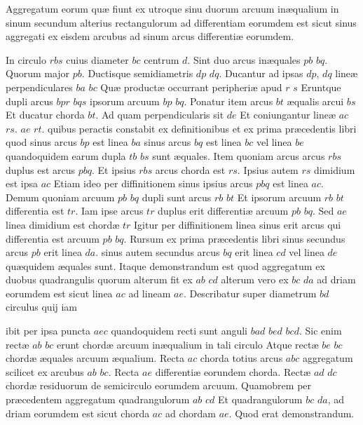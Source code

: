\documentclass[11pt,a4paper]{article}
\begin{document}
Aggregatum eorum quæ fiunt ex utroque sinu duorum arcuum inæqualium in sinum secundum alterius rectangulorum ad differentiam eorumdem est sicut sinus aggregati ex eisdem arcubus ad sinum arcus differentiæ eorumdem.

In circulo $rbs$ cuius diameter $bc$ centrum $d$. Sint duo arcus inæquales $pb$ $bq$. Quorum major $pb$. Ductisque semidiametris $dp$ $dq$. Ducantur ad ipsas $dp$, $dq$ lineæ perpendiculares $ba$ $bc$ Quæ productæ occurrant peripheriæ apud $r$ $s$ Eruntque dupli arcus $bpr$ $bqs$ ipsorum arcuum $bp$ $bq$. Ponatur item arcus $bt$ æqualis arcui $bs$ Et ducatur chorda $bt$. Ad quam perpendicularis sit $de$ Et coniungantur lineæ $ac$ $rs$. $ae$ $rt$. quibus peractis constabit ex definitionibus et ex prima præcedentis libri quod sinus arcus $bp$ est linea $ba$ sinus arcus $bq$ est linea $bc$ vel linea $be$ quandoquidem earum dupla $tb$ $bs$ sunt æquales. Item quoniam arcus arcus $rbs$ duplus est arcus $pbq$. Et ipsius $rbs$ arcus chorda est $rs$. Ipsius autem $rs$ dimidium est ipsa $ac$ Etiam ideo per diffinitionem sinus ipsius arcus $pbq$ est linea $ac$. Demum quoniam arcuum $pb$ $bq$ dupli sunt arcus $rb$ $bt$ Et ipsorum arcuum $rb$ $bt$ differentia est $tr$. Iam ipse arcus $tr$ duplus erit differentiæ arcuum $pb$ $bq$. Sed $ae$ linea dimidium est chordæ $tr$ Igitur per diffinitionem linea  sinus erit arcus qui differentia est arcuum $pb$ $bq$. Rursum ex prima præcedentis libri  sinus secundus arcus $pb$ erit linea $da$. sinus autem secundus arcus $bq$ erit linea $cd$ vel linea $de$ quæquidem æquales sunt. Itaque demonstrandum est quod aggregatum ex duobus quadrangulis quorum alterum fit ex $ab$ $cd$ alterum vero ex $bc$ $da$ ad driam eorumdem est sicut linea $ac$ ad lineam $ae$. Describatur super diametrum $bd$ circulus quij iam

ibit per ipsa puncta $aec$ quandoquidem recti sunt anguli $bad$ $bed$ $bcd$. Sic enim rectæ $ab$ $bc$ erunt chordæ arcuum inæqualium in tali circulo Atque rectæ $be$ $bc$ chordæ æquales arcuum æqualium. Recta $ac$ chorda totius arcus $abc$ aggregatum scilicet ex arcubus $ab$ $bc$. Recta $ae$ differentiæ eorundem chorda. Rectæ $ad$ $dc$ chordæ residuorum de semicirculo eorumdem arcuum. Quamobrem per præcedentem aggregatum quadrangulorum $ab$ $cd$ Et quadrangulorum $bc$ $da$, ad driam eorumdem est sicut chorda $ac$ ad chordam $ae$. Quod erat demonstrandum.
\end{document}
